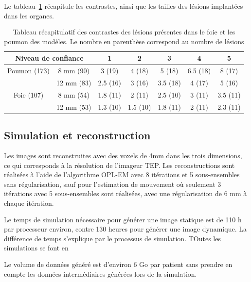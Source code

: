 Le tableau~\ref{tab:contrastePoumonFoieRecap} récapitule les contrastes, ainsi que les tailles des lésions implantées dans les organes.
 
\begin{table}
\centering
 \begin{tabular}{|c|c||c|c|c|c|c|} 
\hline
\multicolumn{2}{|c|}{Niveau de confiance}       & 1	  & 2	    & 3	     & 4	& 5	\\
\hline
\hline
Poumon	(173)	& 8 mm (90)	& 3 (19)  & 4 (18)  & 5 (18)  & 6.5 (18)	& 8 (17)\\
\cline{2-7}
		& 12 mm	(83)	& 2.5 (16)& 3 (16)  & 3.5 (18)& 4 (17)	& 5 (16)\\
\hline
Foie 	(107)	& 8 mm (54)		& 1.8 (11)& 2 (11)  & 2.5 (10)& 3 (11)	& 3.5 (11)\\
\cline{2-7}
		& 12 mm	(53)	& 1.3 (10)& 1.5 (10)& 1.8 (11)& 2 (11)  & 2.3 (11)\\
\hline 
 \end{tabular}

\caption[Tableau récapitulatif des lésions]{Tableau récapitulatif des contrastes des lésions présentes dans le foie et les poumon des modèles. Le nombre en parenthèse correspond au nombre de lésions}
\label{tab:contrastePoumonFoieRecap}


\end{table}


\subsection{Simulation et reconstruction}

Les images sont reconstruites avec des voxels de 4mm dans les trois dimensions, ce qui corresponds à la résolution de l'imageur TEP. Les reconstructions sont réalisées à l'aide de l'algorithme OPL-EM avec 8 itérations et 5 sous-ensembles sans régularisation, sauf pour l'estimation de mouvement où seulement 3 itérations avec 5 sous-ensembles sont réalisées, avec une régularisation de 6 mm à chaque itération. 

Le temps de simulation nécessaire pour générer une image statique est de 110 h par processeur environ, contre 130 heures pour générer une image dynamique. La différence de temps s'explique par le processus de simulation. TOutes les simulations se font en 


Le volume de données généré est d'environ 6 Go par patient sans prendre en compte les données intermédiaires générées lors de la simulation.
